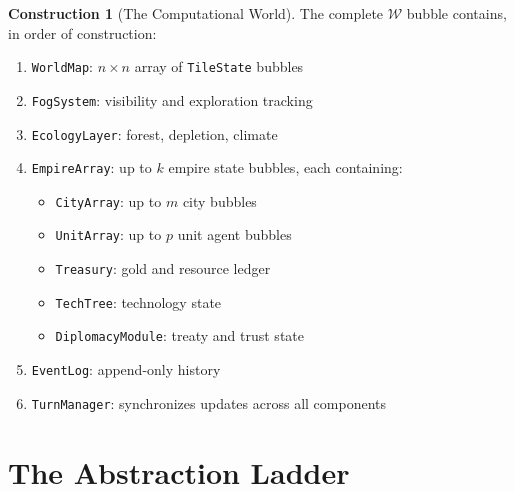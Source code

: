 \documentclass[11pt,a4paper,openany]{book}
\theoremstyle{plain}
\theoremstyle{definition}
\newtheorem{construction}[theorem]{Construction}
\theoremstyle{remark}
\newcommand{\world}{\ensuremath{\mathcal{W}}}
\begin{document}
\begin{construction}[The Computational World]
  The complete $\world$ bubble contains, in order of construction:
  \begin{enumerate}
    \item \texttt{WorldMap}: $n \times n$ array of \texttt{TileState} bubbles
    \item \texttt{FogSystem}: visibility and exploration tracking
    \item \texttt{EcologyLayer}: forest, depletion, climate
    \item \texttt{EmpireArray}: up to $k$ empire state bubbles, each containing:
      \begin{itemize}
        \item \texttt{CityArray}: up to $m$ city bubbles
        \item \texttt{UnitArray}: up to $p$ unit agent bubbles
        \item \texttt{Treasury}: gold and resource ledger
        \item \texttt{TechTree}: technology state
        \item \texttt{DiplomacyModule}: treaty and trust state
      \end{itemize}
    \item \texttt{EventLog}: append-only history
    \item \texttt{TurnManager}: synchronizes updates across all components
  \end{enumerate}
\end{construction}

\section{The Abstraction Ladder}
\end{document}
